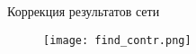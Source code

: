 
\begin{frame}{Коррекция результатов сети}
\begin{figure}
\centering
\texttt{[image: find\_contr.png]}
\end{figure}
\end{frame}